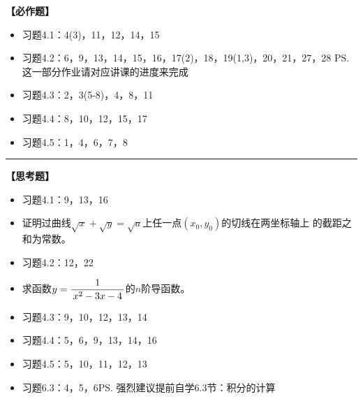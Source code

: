 {\bf 【必作题】}

\begin{itemize}
  \item 习题4.1：4(3)，11，12，14，15
  \item 习题4.2：6，9，13，14，15，16，17(2)，18，19(1,3)，20，21，27，28
  \ps{这一部分作业请对应讲课的进度来完成}
  \item 习题4.3：2，3(5-8)，4，8，11
  \item 习题4.4：8，10，12，15，17
  \item 习题4.5：1，4，6，7，8
\end{itemize}

\bigskip

\hrule

\bigskip
\bigskip

{\bf 【思考题】}

\begin{itemize}
  \item 习题4.1：9，13，16
  \item 证明过曲线$\sqrt x+\sqrt y=\sqrt a$上任一点$(x_0,y_0)$的切线在两坐标轴上
		的截距之和为常数。
  \item 习题4.2：12，22
  \item 求函数$y=\displaystyle\frac{\,{1}\,}{\,{x^2-3x-4}\,}$的$n$阶导函数。
  \item 习题4.3：9，10，12，13，14
  \item 习题4.4：5，6，9，13，14，16
  \item 习题4.5：5，10，11，12，13
  \item 习题6.3：4，5，6\ps{强烈建议提前自学6.3节：积分的计算}
\end{itemize}

\newpage

